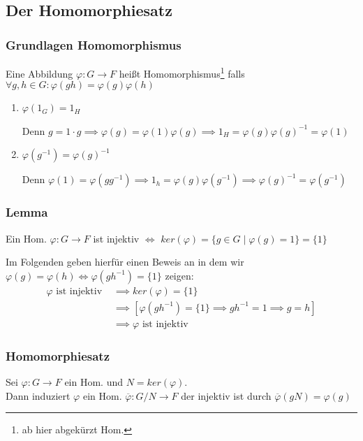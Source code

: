 \documentclass[12pt, german]{article}
\begin{document}
	\subsection{Der Homomorphiesatz}		
	\subsubsection{Grundlagen Homomorphismus}
	Eine Abbildung $\varphi: G \to F$ heißt Homomorphismus\footnote{ab hier abgekürzt Hom.} falls $\forall g,h \in G : \varphi(gh) = \varphi(g)\varphi(h)$ \\
	\begin{enumerate}[label=\roman*)]
		\item $\varphi(1_G) = 1_H$ ~\par
		Denn $g=1\cdot g \implies \varphi(g)=\varphi(1)\varphi(g) \implies 1_H = \varphi(g) \varphi(g)^{-1} = \varphi(1)$
		
		\item $\varphi(g^{-1})=\varphi(g)^{-1}$ ~\par
		Denn $\varphi(1)=\varphi(gg^{-1}) \implies 1_h = \varphi(g)\varphi(g^{-1}) \implies \varphi(g)^{-1} = \varphi(g^{-1})$
	\end{enumerate}
	
	\subsubsection{Lemma}
	Ein Hom. $\varphi: G \to F$ ist injektiv $\iff$ $ker(\varphi) = \{g \in G \mid \varphi(g)= 1\} = \{1\}$ 
	
	Im Folgenden geben hierfür einen Beweis an in dem wir $\varphi(g) = \varphi(h) \iff \varphi(gh^{-1}) = \{1\} $ zeigen:
	\begin{align*}
		\varphi \text{ ist injektiv } &\implies ker(\varphi) = \{1\} \\
		&\implies [\varphi(gh^{-1}) = \{1\} \implies gh^{-1} = 1 \implies g = h] \\ 
		&\implies \varphi \text{ ist injektiv}
	\end{align*}
	
	\subsubsection{Homomorphiesatz}
	Sei $\varphi: G \to F$ ein Hom.  und $N = ker(\varphi)$. \\
	Dann induziert $\varphi$ ein Hom. $\overline{\varphi} : G/N \to F$ der injektiv ist durch $\overline{\varphi}(gN) = \varphi(g)$ 
	\newline
	
\end{document}
